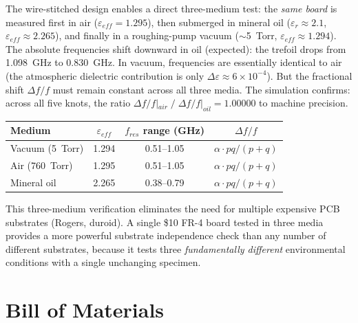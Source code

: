 The wire-stitched design enables a direct three-medium test: the \textit{same board} is measured first in air ($\varepsilon_{eff} = 1.295$), then submerged in mineral oil ($\varepsilon_{r} \approx 2.1$, $\varepsilon_{eff} \approx 2.265$), and finally in a roughing-pump vacuum ($\sim$5~Torr, $\varepsilon_{eff} \approx 1.294$). The absolute frequencies shift downward in oil (expected): the trefoil drops from 1.098~GHz to 0.830~GHz. In vacuum, frequencies are essentially identical to air (the atmospheric dielectric contribution is only $\Delta\varepsilon \approx 6\times10^{-4}$). But the fractional shift $\Delta f / f$ must remain constant across all three media. The simulation confirms: across all five knots, the ratio $\Delta f/f|_{air} \;/\; \Delta f/f|_{oil} = 1.00000$ to machine precision.

\begin{center}
\begin{tabular}{|l|c|c|c|}
\hline
Medium & $\varepsilon_{eff}$ & $f_{res}$ range (GHz) & $\Delta f/f$ \\ \hline
Vacuum (5~Torr) & 1.294 & 0.51--1.05 & $\alpha \cdot pq/(p{+}q)$ \\
Air (760~Torr)  & 1.295 & 0.51--1.05 & $\alpha \cdot pq/(p{+}q)$ \\
Mineral oil     & 2.265 & 0.38--0.79 & $\alpha \cdot pq/(p{+}q)$ \\ \hline
\end{tabular}
\end{center}

\noindent This three-medium verification eliminates the need for multiple expensive PCB substrates (Rogers, duroid). A single \$10 FR-4 board tested in three media provides a more powerful substrate independence check than any number of different substrates, because it tests three \textit{fundamentally different} environmental conditions with a single unchanging specimen.

\section{Bill of Materials}

